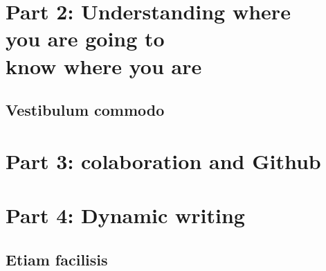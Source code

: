\part{Part 2: Understanding where \\you are going to \\
know where you are}
\newpage
\chapter{Vestibulum commodo} \label{ch:commodo}


\part{Part 3: colaboration and Github}

\part{Part 4: Dynamic writing}

\newpage
\chapter{Etiam facilisis} \label{ch:etiam}

\newpage




\listoffigures
\listoftables
\newpage
\printbibliography[title = {Aliquam}]


